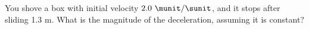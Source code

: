 %
You shove a box with initial velocity $2.0\ \munit/\sunit$, and 
it stops after sliding 1.3 m.
What is the
magnitude of the deceleration, assuming it is constant?\answercheck
